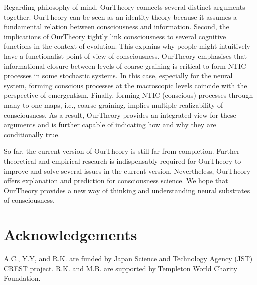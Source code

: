 \documentclass[utf8]{article}
\begin{document}
	
	Regarding philosophy of mind, \ac{OurTheory} connects several distinct arguments together. \ac{OurTheory} can be seen as an identity theory because it assumes a fundamental relation between consciousness and information. Second, the implications of \ac{OurTheory} tightly link consciousness to several cognitive functions in the context of evolution. This explains why people might intuitively have a functionalist point of view of consciousness. \ac{OurTheory} emphasises that informational closure between levels of coarse-graining is critical to form NTIC processes in some stochastic systems. In this case, especially for the neural system, forming conscious processes at the macroscopic levels coincide with the perspective of emergentism. Finally, forming NTIC (conscious) processes through many-to-one maps, i.e., coarse-graining, implies multiple realizability of consciousness. As a result, \ac{OurTheory} provides an integrated view for these arguments and is further capable of indicating how and why they are conditionally true.

	So far, the current version of \ac{OurTheory} is still far from completion. Further theoretical and empirical research is indispensably required for \ac{OurTheory} to improve and solve several issues in the current version. Nevertheless, \ac{OurTheory} offers explanation and prediction for consciousness science. We hope that \ac{OurTheory} provides a new way of thinking and understanding neural substrates of consciousness.  
	
	\section*{Acknowledgements}
	A.C., Y.Y, and R.K. are funded by Japan Science and Technology Agency (JST) CREST project. R.K. and M.B. are supported by Templeton World Charity Foundation.

	
	
\end{document}

